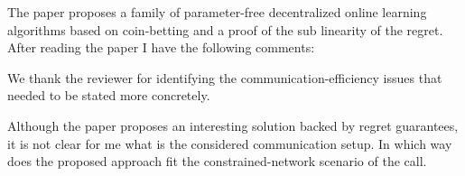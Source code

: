 \documentclass[12pt,english]{reviewresponse}
\begin{document}
\reviewer{}
\begin{generalcomment}
    The paper proposes a family of parameter-free decentralized online learning algorithms based on coin-betting and a proof of the sub linearity of the regret. After reading the paper I have the following comments:
\end{generalcomment}
\begin{revresponse}
    We thank the reviewer for identifying the communication-efficiency issues that needed to be stated more concretely.
\end{revresponse}

\begin{revcomment}
    Although the paper proposes an interesting solution backed by regret guarantees, it is not clear for me what is the considered communication setup. In which way does the proposed approach fit the constrained-network scenario of the call.
\end{revcomment}
\end{document}
